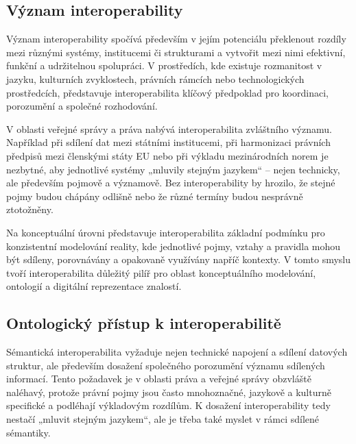 
\subsection{Význam interoperability}
\label{sec:význam-interoperability}
Význam interoperability spočívá především v jejím potenciálu překlenout rozdíly mezi různými systémy, institucemi či strukturami a vytvořit mezi nimi efektivní, funkční a udržitelnou spolupráci. V prostředích, kde existuje rozmanitost v jazyku, kulturních zvyklostech, právních rámcích nebo technologických prostředcích, představuje interoperabilita klíčový předpoklad pro koordinaci, porozumění a společné rozhodování. \cite{Otto2022,Kalfoglou2005}

V oblasti veřejné správy a práva nabývá interoperabilita zvláštního významu. Například při sdílení dat mezi státními institucemi, při harmonizaci právních předpisů mezi členskými státy EU nebo při výkladu mezinárodních norem je nezbytné, aby jednotlivé systémy „mluvily stejným jazykem“ – nejen technicky, ale především pojmově a významově. Bez interoperability by hrozilo, že stejné pojmy budou chápány odlišně nebo že různé termíny budou nesprávně ztotožněny. \cite{sdeleni_interoperabilita}

Na konceptuální úrovni představuje interoperabilita základní podmínku pro konzistentní modelování reality, kde jednotlivé pojmy, vztahy a pravidla mohou být sdíleny, porovnávány a opakovaně využívány napříč kontexty. V tomto smyslu tvoří interoperabilita důležitý pilíř pro oblast konceptuálního modelování, ontologií a digitální reprezentace znalostí. \cite{Sarantis2011}


\subsection{Ontologický přístup k interoperabilitě}
\label{sec:ontologický-přístup-k-interoperabilitě}
Sémantická interoperabilita vyžaduje nejen technické napojení a sdílení datových struktur, ale především dosažení společného porozumění významu sdílených informací. Tento požadavek je v oblasti práva a veřejné správy obzvláště naléhavý, protože právní pojmy jsou často mnohoznačné, jazykově a kulturně specifické a podléhají výkladovým rozdílům. K dosažení interoperability tedy nestačí „mluvit stejným jazykem“, ale je třeba také myslet v rámci sdílené sémantiky.

